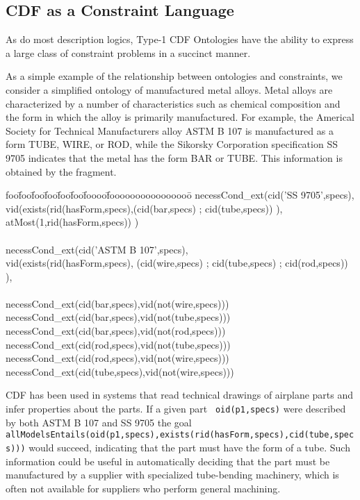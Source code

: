 \subsection{CDF as a Constraint Language}

As do most description logics, Type-1 CDF Ontologies have the ability
to express a large class of constraint problems in a succinct manner.

\begin{example} \rm
As a simple example of the relationship between ontologies and
constraints, we consider a simplified ontology of manufactured metal
alloys.  Metal alloys are characterized by a number of characteristics
such as chemical composition and the form in which the alloy is
primarily manufactured.  For example, the Americal Society for
Technical Manufacturers alloy ASTM B 107 is manufactured as a form
TUBE, WIRE, or ROD, while the Sikorsky Corporation specification SS
9705 indicates that the metal has the form BAR or TUBE.  This
information is obtained by the fragment.
{\tt  {\small 
\begin{tabbing} foo\=foo\=foo\=foo\=foo\=foo\=foooo\=foooooooooooooooo\=\kill
\> necessCond\_ext(cid('SS 9705',specs), \\
\> \> \>              vid(exists(rid(hasForm,specs),(cid(bar,specs) ; cid(tube,specs)) ), \\
\> \> \> 	              atMost(1,rid(hasForm,specs)) ) \\
\\
\> necessCond\_ext(cid('ASTM B 107',specs), \\
\>\> \>              vid(exists(rid(hasForm,specs),
	(cid(wire,specs) ; cid(tube,specs) ; cid(rod,specs)) ), \\
\\
\> necessCond\_ext(cid(bar,specs),vid(not(wire,specs))) \\
\> necessCond\_ext(cid(bar,specs),vid(not(tube,specs))) \\
\> necessCond\_ext(cid(bar,specs),vid(not(rod,specs))) \\
\> necessCond\_ext(cid(rod,specs),vid(not(tube,specs))) \\
\> necessCond\_ext(cid(rod,specs),vid(not(wire,specs))) \\
\> necessCond\_ext(cid(tube,specs),vid(not(wire,specs))) 
\end{tabbing} }}
CDF has been used in systems that read technical drawings of airplane
parts and infer properties about the parts.  If a given part {\tt
oid(p1,specs)} were described by both ASTM B 107 and SS 9705 the goal
{\tt
allModelsEntails(oid(p1,specs),exists(rid(hasForm,specs),cid(tube,specs)))}
would succeed, indicating that the part must have the form of a tube.
Such information could be useful in automatically deciding that the
part must be manufactured by a supplier with specialized tube-bending
machinery, which is often not available for suppliers who perform
general machining.
\end{example}

